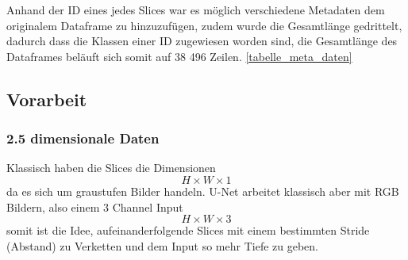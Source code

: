 Anhand der ID eines jedes Slices war es möglich verschiedene Metadaten dem originalem Dataframe zu hinzuzufügen, zudem wurde die Gesamtlänge gedrittelt, dadurch dass die Klassen einer ID  zugewiesen worden sind, die Gesamtlänge des Dataframes beläuft sich somit auf 38 496 Zeilen. \autoref{tabelle_meta_daten}


\begin{table}[H]
 \begin{center}
   \caption{Metadaten von drei slices}\label{tabelle_meta_daten}
 \end{center}
\end{table}

\subsection{Vorarbeit}

\subsubsection{2.5 dimensionale Daten}

Klassisch haben die Slices die Dimensionen 
\begin{equation}
H \times W \times 1
\end{equation}
da es sich um graustufen Bilder handeln. U-Net arbeitet klassisch aber mit RGB Bildern, also einem 3 Channel Input
\begin{equation}
H \times W \times 3
\end{equation}
somit ist die Idee, aufeinanderfolgende Slices mit einem bestimmten Stride (Abstand) zu Verketten und dem Input so mehr Tiefe zu geben.

